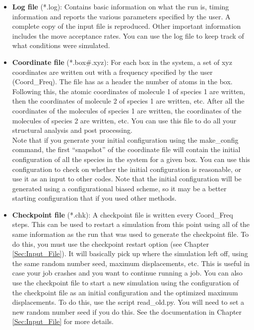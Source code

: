 \begin{itemize}

\item {\bf Log file} (*.log): Contains basic information on what the run is, timing information and reports the various parameters specified by the user. A complete copy of the input file is reproduced. Other important information includes the move acceptance rates. You can use the log file to keep track of what conditions were simulated.

\item {\bf Coordinate file} (*.box\#.xyz): For each box in the system, a set of xyz coordinates are written out with a frequency specified by the user (Coord\_Freq). The file has as a header the number of atoms in the box. Following this, the atomic coordinates of molecule 1 of species 1 are written, then the coordinates of molecule 2 of species 1 are written, etc. After all the coordinates of the molecules of species 1 are written, the coordinates of the molecules of species 2 are written, etc. You can use this file to do all your structural analysis and post processing.\\

Note that if you generate your initial configuration using the make\_config command, the first ``snapshot'' of the coordinate file
will contain the initial configuration of all the species in the system for a given box. You can use this configuration to check on whether the initial configuration 
is reasonable, or use it as an input to other codes. Note that the initial configuration will be generated using a configurational biased scheme,  
so it may be a better starting configuration that if you used other methods. 

\item {\bf Checkpoint file} (*.chk): A checkpoint file is written every Coord\_Freq steps. This can be used to restart a simulation from this point using all of the same information as the run that was used to generate the checkpoint file. To do this, you must use the checkpoint restart option (see Chapter \ref{Sec:Input_File}). It will basically pick up where the simulation left off, using the same random number seed, maximum displacements, etc. This is useful in case your job crashes and you want to continue running a job. You can also use the checkpoint file to start a new simulation using the  configuration of the checkpoint file as an initial configuration and the optimized maximum displacements.  To do this, use the script read\_old.py. You will need to set a new random number seed if you do this. See the documentation in Chapter \ref{Sec:Input_File} for more details.


\end{itemize}
